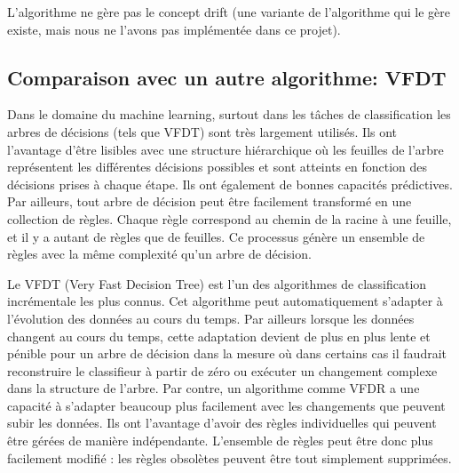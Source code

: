         L’algorithme ne gère pas le concept drift (une variante de l’algorithme qui le gère existe, mais nous ne l’avons pas implémentée dans ce projet).

    \subsection{Comparaison avec un autre algorithme: VFDT}

        Dans le domaine du machine learning, surtout dans les tâches de classification les arbres de décisions (tels que VFDT) sont très largement utilisés. Ils ont l’avantage d’être lisibles avec une structure hiérarchique où les  feuilles de l’arbre représentent les différentes décisions possibles et sont atteints en fonction des décisions prises à chaque étape. Ils ont également de bonnes capacités prédictives. Par ailleurs, tout arbre de décision peut être facilement transformé en une collection de règles. Chaque règle correspond au chemin de la racine à une feuille, et il y a autant de règles que de feuilles. Ce processus génère un ensemble  de règles avec la même complexité qu’un arbre de décision. 

        Le VFDT (Very Fast Decision Tree) est l’un des algorithmes de classification incrémentale les plus connus. Cet algorithme peut automatiquement s’adapter à l’évolution des données au cours du temps. Par ailleurs lorsque les données changent au cours du temps, cette adaptation devient de plus en plus lente et pénible pour un arbre de décision dans la mesure où dans certains cas il faudrait reconstruire le classifieur à partir de zéro ou exécuter un changement complexe dans la structure de l’arbre. Par contre, un algorithme comme VFDR a une capacité à s’adapter beaucoup plus facilement avec les changements que peuvent subir les données. Ils ont l’avantage d’avoir des règles individuelles qui peuvent être gérées de manière indépendante. L’ensemble de règles peut être donc plus facilement modifié : les règles obsolètes peuvent être tout simplement supprimées. 